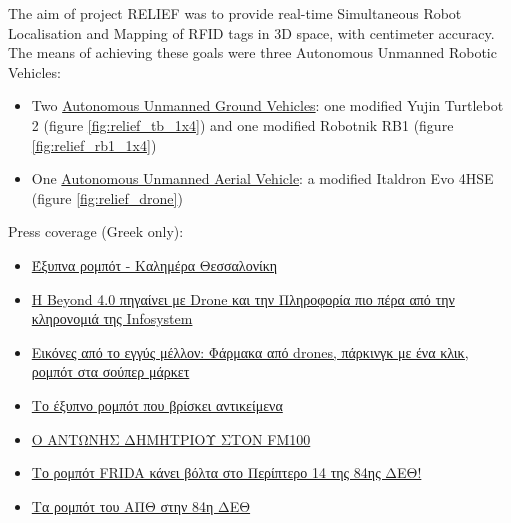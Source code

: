 The aim of project RELIEF was to provide real-time Simultaneous Robot
Localisation and Mapping of RFID tags in 3D space, with centimeter accuracy. The
means of achieving these goals were three Autonomous Unmanned Robotic Vehicles:

\begin{itemize}
  \item Two
        \href{https://www.youtube.com/watch?v=bo4lMI640DY}{Autonomous Unmanned Ground Vehicles}:
        one modified Yujin Turtlebot 2 (figure \ref{fig:relief_tb_1x4}) and one
        modified Robotnik RB1 (figure \ref{fig:relief_rb1_1x4})
  \item One
        \href{https://www.youtube.com/watch?v=9YpBIaO4tgY}{Autonomous Unmanned Aerial Vehicle}:
        a modified Italdron Evo 4HSE (figure \ref{fig:relief_drone})
\end{itemize}

\noindent Press coverage (Greek only):

\begin{itemize}
  \singlespacing
  \item \href{https://www.facebook.com/watch/?v=525073015980746}{Έξυπνα ρομπότ - Καλημέρα Θεσσαλονίκη}
  \item \href{https://www.amna.gr/macedonia/article/593568/I-Beyond-40-pigainei-me-Drone-kai-tin-Pliroforia-pio-pera-apo-tin-klironomia-tis-Infosystem}{Η Beyond 4.0 πηγαίνει με Drone και την Πληροφορία πιο πέρα από την κληρονομιά της Infosystem}
  \item \href{https://www.kathimerini.gr/society/561544489/vinteo-k-eikones-apo-to-eggys-mellon-farmaka-apo-drones-parkingk-me-ena-klik-rompot-sta-soyper-market/}{Εικόνες από το εγγύς μέλλον: Φάρμακα από drones, πάρκινγκ με ένα κλικ, ρομπότ στα σούπερ μάρκετ}
  \item \href{https://www.thessnews.gr/reportaz/to-exypno-robot-pou-vriskei-antikeimena-foto-video/}{Το έξυπνο ρομπότ που βρίσκει αντικείμενα}
  \item \href{https://fm100.gr/media/single/o-antonis-dimitrioy-ston-fm100-o-fm100-stin-84i-deth}{Ο ΑΝΤΩΝΗΣ ΔΗΜΗΤΡΙΟΥ ΣΤΟΝ FM100}
  \item \href{https://www.typosthes.gr/thessaloniki/195192_rompot-frida-kanei-bolta-sto-periptero-14-tis-84is-deth-video}{Το ρομπότ FRIDA κάνει βόλτα στο Περίπτερο 14 της 84ης ΔΕΘ!}
  \item \href{https://www.amna.gr/home/videos/391130/Ta-rompot-tou-APTh-stin-84i-DETh}{Τα ρομπότ του ΑΠΘ στην 84η ΔΕΘ}
\end{itemize}


